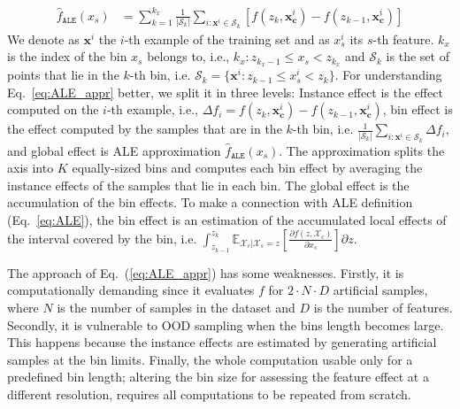 \documentclass[wcp]{jmlr}
\newcommand{\Xcb}{\mathcal{X}_c}
\newcommand{\xci}{\mathbf{x}^i_{\mathbf{c}}}
\newcommand{\xb}{\mathbf{x}}
\newcommand{\E}{\mathbb{E}}
\begin{document}
\begin{align}
  \hat{f}_{\mathtt{ALE}}(x_s) &= \sum_{k=1}^{k_x} \frac{1}{|\mathcal{S}_k|} \sum_{i:\xb^i \in \mathcal{S}_k} [f(z_k,\xci) - f(z_{k-1}, \xci)]
  \label{eq:ALE_appr}
\end{align}
%
We denote as \( \xb^i \) the \(i\)-th example of the training set and
as \(x_s^i\) its \(s\)-th feature. \(k_x\) is the index of the bin
\(x_s\) belongs to, i.e., \(k_x: z_{k_x-1} \leq x_s < z_{k_x} \) and
\(\mathcal{S}_k\) is the set of points that lie in the \(k\)-th bin,
i.e.  \( \mathcal{S}_k = \{ \xb^i : z_{k-1} \leq x^i_s < z_{k} \} \).
For understanding Eq.~\eqref{eq:ALE_appr} better, we split it in three
levels: Instance effect is the effect computed on the \(i\)-th
example, i.e., \(\Delta f_i = f(z_k,\xci) - f(z_{k-1}, \xci)\), bin
effect is the effect computed by the samples that are in the \(k\)-th
bin, i.e.
\(\frac{1}{|\mathcal{S}_k|} \sum_{i:\xb^i \in \mathcal{S}_k} \Delta
f_i \), and global effect is ALE approximation
\(\hat{f}_{\mathtt{ALE}}(x_s)\). The approximation splits the axis
into \( K \) equally-sized bins and computes each bin effect by
averaging the instance effects of the samples that lie in each
bin. The global effect is the accumulation of the bin effects. To make
a connection with ALE definition (Eq.~\ref{eq:ALE}), the bin effect is
an estimation of the accumulated local effects of the interval covered
by the bin, i.e.
\(\int_{z_{k-1}}^{z_k} \E_{\Xcb|\mathcal{X}_s=z}\left[\frac{\partial
    f(z,\Xcb)}{\partial x_s}\right] \partial z \).

The approach of Eq.~(\ref{eq:ALE_appr}) has some weaknesses. Firstly,
it is computationally demanding since it evaluates \(f\) for
\(2 \cdot N \cdot D\) artificial samples, where \(N\) is the number of
samples in the dataset and \(D\) is the number of features.  Secondly,
it is vulnerable to OOD sampling when the bins length becomes
large. This happens because the instance effects are estimated by
generating artificial samples at the bin limits. Finally, the whole
computation usable only for a predefined bin length; altering the bin
size for assessing the feature effect at a different resolution,
requires all computations to be repeated from scratch.
\end{document}
